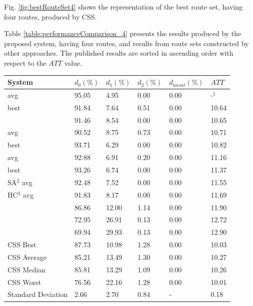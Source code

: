Fig. \vref{fig:bestRouteSet4} shows the representation of the best route set, having four routes, produced by CSS.

Table \vref{table:performanceComparison_4} presents the results produced by the proposed system, having four routes, and results from route sets constructed by other approaches. The published results are sorted in ascending order with respect to the $ATT$ value.

\begin{table}[H]
	\centering
    \hspace*{-1.0cm}
    \begin{tabular}{|l|l|l|l|l|l|}
 	\hline
 	\textbf{System} & $d_0(\%)$ & $d_1(\%)$ & $d_2(\%)$ & $d_{unsat}(\%)$ & $ATT$ \\
 	\hline
    \citet{nikolic14} avg & 95.05 & 4.95 & 0.00 & 0.00 & -$^1$ \\
    \citet{kechagiopoulos14} best & 91.84 & 7.64 & 0.51 & 0.00 & 10.64 \\
    \citet{zhang10} & 91.46 & 8.54 & 0.00 & 0.00 & 10.65 \\
    \citet{kechagiopoulos14} avg & 90.52 & 8.75 & 0.73 & 0.00 & 10.71 \\
    \citet{chew12} best & 93.71 & 6.29 & 0.00 & 0.00 & 10.82 \\
    \citet{chew12} avg & 92.88 & 6.91 & 0.20 & 0.00 & 11.16 \\
    \citet{fan10} best & 93.26 & 6.74 & 0.00 & 0.00 & 11.37 \\
    \citet{fan10} SA$^2$ avg & 92.48 & 7.52 & 0.00 & 0.00 & 11.55 \\
    \citet{fan10} HC$^3$ avg & 91.83 & 8.17 & 0.00 & 0.00 & 11.69 \\
    \citet{chakroborty02} & 86.86 & 12.00 & 1.14 & 0.00 & 11.90 \\
    \citet{kidwai98} & 72.95 & 26.91 & 0.13 & 0.00 & 12.72 \\
    \citet{mandl79} & 69.94 & 29.93 & 0.13 & 0.00 & 12.90 \\
    \hline
    CSS Best & 87.73 & 10.98 & 1.28 & 0.00 & 10.03\\
    CSS Average & 85.21 & 13.49 & 1.30 & 0.00 & 10.27\\
    CSS Median & 85.81 & 13.29 & 1.09 & 0.00 & 10.26\\
    CSS Worst & 76.56 & 22.16 & 1.28 & 0.00 & 10.01\\
    Standard Deviation & 2.66 & 2.70 & 0.84 & - & 0.18\\

\end{tabular}
\end{table}
